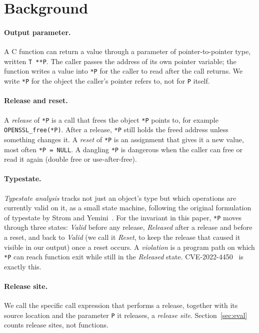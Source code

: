 \section{Background}
\label{sec:background}

\paragraph{Output parameter.} A C function can return a value through a
parameter of pointer-to-pointer type, written \texttt{T **P}. The caller
passes the address of its own pointer variable; the function writes a
value into \texttt{*P} for the caller to read after the call returns. We
write \texttt{*P} for the object the caller's pointer refers to, not for
\texttt{P} itself.

\paragraph{Release and reset.} A \emph{release} of \texttt{*P} is a call
that frees the object \texttt{*P} points to, for example
\texttt{OPENSSL\_free(*P)}. After a release, \texttt{*P} still holds the
freed address unless something changes it. A \emph{reset} of \texttt{*P}
is an assignment that gives it a new value, most often \texttt{*P = NULL}.
A dangling \texttt{*P} is dangerous when the caller can free or read it
again (double free or use-after-free).

\paragraph{Typestate.} \emph{Typestate analysis} tracks not just an
object's type but which operations are currently valid on it, as a small
state machine, following the original formulation of typestate by Strom
and Yemini~\cite{strom1986typestate}. For the invariant in this paper,
\texttt{*P} moves through three states: \emph{Valid} before any release,
\emph{Released} after a release and before a reset, and back to
\emph{Valid} (we call it \emph{Reset}, to keep the release that caused it
visible in our output) once a reset occurs. A \emph{violation} is a
program path on which \texttt{*P} can reach function exit while still in
the \emph{Released} state. CVE-2022-4450~\cite{nvd2022cve4450} is exactly this.

\paragraph{Release site.} We call the specific call expression that
performs a release, together with its source location and the parameter
\texttt{P} it releases, a \emph{release site}. Section~\ref{sec:eval}
counts release sites, not functions.


